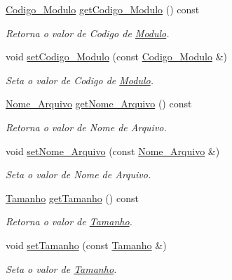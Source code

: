 \begin{DoxyCompactItemize}
\item 
\hyperlink{class_codigo___modulo}{\-Codigo\-\_\-\-Modulo} \hyperlink{class_modulo_a966939d6761114d5030ca10c816302ac}{get\-Codigo\-\_\-\-Modulo} () const 
\begin{DoxyCompactList}\small\item\em \-Retorna o valor de \-Codigo de \hyperlink{class_modulo}{\-Modulo}. \end{DoxyCompactList}\item 
void \hyperlink{class_modulo_a8b41e4725c45aa47b5454008f517c392}{set\-Codigo\-\_\-\-Modulo} (const \hyperlink{class_codigo___modulo}{\-Codigo\-\_\-\-Modulo} \&)
\begin{DoxyCompactList}\small\item\em \-Seta o valor de \-Codigo de \hyperlink{class_modulo}{\-Modulo}. \end{DoxyCompactList}\item 
\hyperlink{class_nome___arquivo}{\-Nome\-\_\-\-Arquivo} \hyperlink{class_modulo_af4662253c0b78f248b02e3925a5d102c}{get\-Nome\-\_\-\-Arquivo} () const 
\begin{DoxyCompactList}\small\item\em \-Retorna o valor de \-Nome de \-Arquivo. \end{DoxyCompactList}\item 
void \hyperlink{class_modulo_a52d8354c7eb434f05ea76fbbcf715f9b}{set\-Nome\-\_\-\-Arquivo} (const \hyperlink{class_nome___arquivo}{\-Nome\-\_\-\-Arquivo} \&)
\begin{DoxyCompactList}\small\item\em \-Seta o valor de \-Nome de \-Arquivo. \end{DoxyCompactList}\item 
\hyperlink{class_tamanho}{\-Tamanho} \hyperlink{class_modulo_a64213272a845de661228d9117560d405}{get\-Tamanho} () const 
\begin{DoxyCompactList}\small\item\em \-Retorna o valor de \hyperlink{class_tamanho}{\-Tamanho}. \end{DoxyCompactList}\item 
void \hyperlink{class_modulo_ac39f3f24b46921700cd9231b2b67ddd9}{set\-Tamanho} (const \hyperlink{class_tamanho}{\-Tamanho} \&)
\begin{DoxyCompactList}\small\item\em \-Seta o valor de \hyperlink{class_tamanho}{\-Tamanho}. \end{DoxyCompactList}\end{DoxyCompactItemize}


